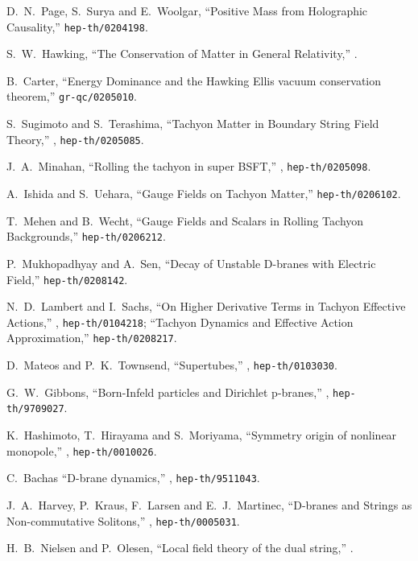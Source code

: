 \documentclass[a4paper,12pt]{article}
\begin{document}
\begin{thebibliography}{99}
 D.\ N.\ Page, S.\ Surya and E.\ Woolgar, 
``Positive Mass from Holographic Causality,'' 
{\tt hep-th/0204198}.

 S.\ W.\ Hawking, ``The Conservation of Matter in
General Relativity,'' .

 B.\ Carter, ``Energy Dominance and the Hawking
Ellis vacuum conservation theorem,'' {\tt gr-qc/0205010}.

S.\ Sugimoto and S.\ Terashima, 
``Tachyon Matter in Boundary String Field Theory,''
,
{\tt hep-th/0205085}.

J.\ A.\ Minahan, 
``Rolling the tachyon in super BSFT,''
, {\tt hep-th/0205098}.


A.\ Ishida and S.\ Uehara,
``Gauge Fields on Tachyon Matter,''  {\tt hep-th/0206102}. 

T.\ Mehen and B.\ Wecht, 
``Gauge Fields and Scalars in Rolling Tachyon Backgrounds,''
{\tt hep-th/0206212}.

P.~Mukhopadhyay and A.~Sen,
``Decay of Unstable D-branes with Electric Field,''
{\tt hep-th/0208142}.

N.\ D.\ Lambert and I.\ Sachs, 
``On Higher Derivative Terms in Tachyon Effective Actions,''
, {\tt hep-th/0104218};
``Tachyon Dynamics and Effective Action Approximation,''
{\tt hep-th/0208217}.

D.~Mateos and P.~K.~Townsend,
``Supertubes,''
, {\tt hep-th/0103030}.

G.~W.~Gibbons,
``Born-Infeld particles and Dirichlet p-branes,''
, {\tt hep-th/9709027}.

K.~Hashimoto, T.~Hirayama and S.~Moriyama,
``Symmetry origin of nonlinear monopole,''
, {\tt hep-th/0010026}.

C.\ Bachas 
``D-brane dynamics,''
, {\tt hep-th/9511043}.

%

J.\ A.\ Harvey, P.\ Kraus, F.\ Larsen and E.\ J.\ Martinec,
``D-branes and Strings as Non-commutative Solitons,''
, {\tt hep-th/0005031}.

H.\ B.\ Nielsen and P.\ Olesen, 
``Local field theory of the dual string,''
.


\end{thebibliography}
\end{document}
